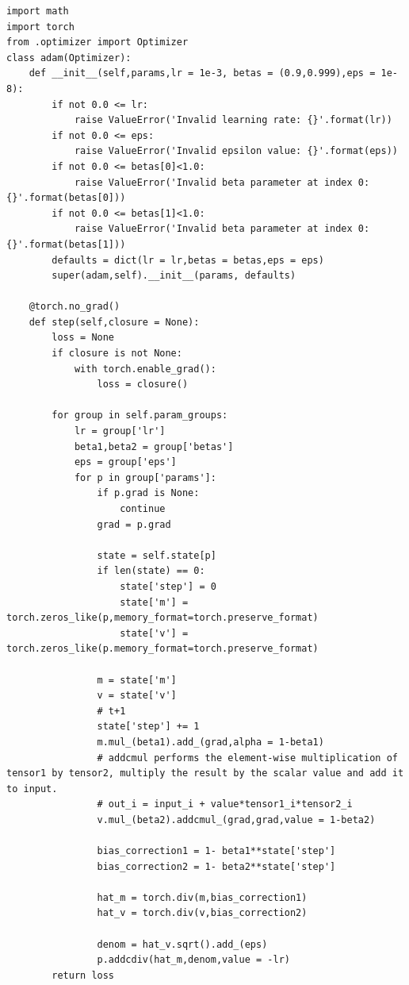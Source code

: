 \documentclass[11pt,en,bibstyle=ieeetr]{elegantpaper}
\begin{document}
\begin{lstlisting}
import math
import torch
from .optimizer import Optimizer
class adam(Optimizer):
    def __init__(self,params,lr = 1e-3, betas = (0.9,0.999),eps = 1e-8):
        if not 0.0 <= lr:
            raise ValueError('Invalid learning rate: {}'.format(lr))
        if not 0.0 <= eps:
            raise ValueError('Invalid epsilon value: {}'.format(eps))
        if not 0.0 <= betas[0]<1.0:
            raise ValueError('Invalid beta parameter at index 0: {}'.format(betas[0]))
        if not 0.0 <= betas[1]<1.0:
            raise ValueError('Invalid beta parameter at index 0: {}'.format(betas[1]))
        defaults = dict(lr = lr,betas = betas,eps = eps)
        super(adam,self).__init__(params, defaults)
        
    @torch.no_grad()
    def step(self,closure = None):
        loss = None
        if closure is not None:
            with torch.enable_grad():
                loss = closure()
        
        for group in self.param_groups:
            lr = group['lr']
            beta1,beta2 = group['betas']
            eps = group['eps']
            for p in group['params']:
                if p.grad is None:
                    continue
                grad = p.grad

                state = self.state[p]
                if len(state) == 0:
                    state['step'] = 0
                    state['m'] = torch.zeros_like(p,memory_format=torch.preserve_format)
                    state['v'] = torch.zeros_like(p.memory_format=torch.preserve_format)
                
                m = state['m']
                v = state['v']
                # t+1
                state['step'] += 1
                m.mul_(beta1).add_(grad,alpha = 1-beta1)
                # addcmul performs the element-wise multiplication of tensor1 by tensor2, multiply the result by the scalar value and add it to input.
                # out_i = input_i + value*tensor1_i*tensor2_i
                v.mul_(beta2).addcmul_(grad,grad,value = 1-beta2)

                bias_correction1 = 1- beta1**state['step']
                bias_correction2 = 1- beta2**state['step']

                hat_m = torch.div(m,bias_correction1)
                hat_v = torch.div(v,bias_correction2)

                denom = hat_v.sqrt().add_(eps)
                p.addcdiv(hat_m,denom,value = -lr)
        return loss
\end{lstlisting}
\end{document}
